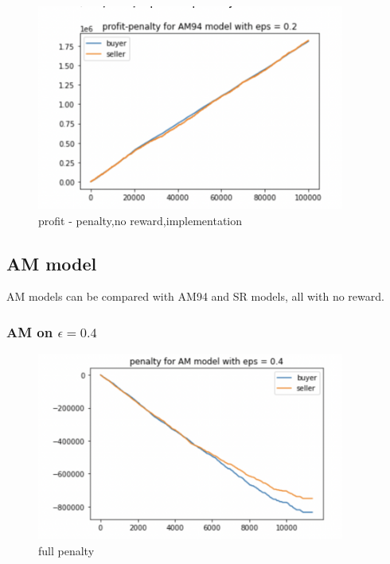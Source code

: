 \documentclass[11pt]{article}
\begin{document}
\begin{figure}[H]
	\begin{center}
	\includegraphics[width=0.9\textwidth]{36.PNG}
	\end{center}
	\caption{profit - penalty,no reward,implementation}
	\label{FIG.36}
\end{figure}


\subsection{AM model}
AM models can be compared with AM94 and SR models, all with no reward.
\subsubsection{AM on $\epsilon = 0.4$}

\begin{figure}[H]
	\begin{center}
	\includegraphics[width=0.9\textwidth]{37.PNG}
	\end{center}
	\caption{full penalty}
	\label{FIG.37}
\end{figure}
\end{document}
